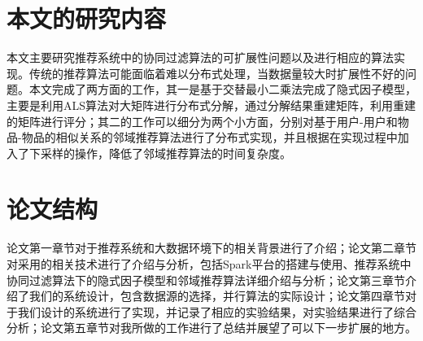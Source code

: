 \section{本文的研究内容}
本文主要研究推荐系统中的协同过滤算法的可扩展性问题以及进行相应的算法实现。传统的推荐算法可能面临着难以分布式处理，当数据量较大时扩展性不好的问题。本文完成了两方面的工作，其一是基于交替最小二乘法完成了隐式因子模型，主要是利用ALS算法对大矩阵进行分布式分解，通过分解结果重建矩阵，利用重建的矩阵进行评分；其二的工作可以细分为两个小方面，分别对基于用户-用户和物品-物品的相似关系的邻域推荐算法进行了分布式实现，并且根据在实现过程中加入了下采样的操作，降低了邻域推荐算法的时间复杂度。
\section{论文结构}
论文第一章节对于推荐系统和大数据环境下的相关背景进行了介绍；论文第二章节对采用的相关技术进行了介绍与分析，包括Spark平台的搭建与使用、推荐系统中协同过滤算法下的隐式因子模型和邻域推荐算法详细介绍与分析；论文第三章节介绍了我们的系统设计，包含数据源的选择，并行算法的实际设计；论文第四章节对于我们设计的系统进行了实现，并记录了相应的实验结果，对实验结果进行了综合分析；论文第五章节对我所做的工作进行了总结并展望了可以下一步扩展的地方。
